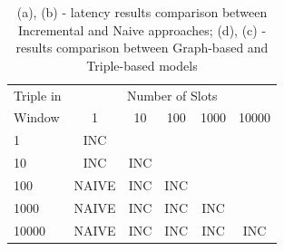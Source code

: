 \begin{table}[htbp]
{\begin{tabular}{l | ccccc}
	  	\hline
		Triple in & \multicolumn{5}{c}{Number of Slots}  \\
		 Window  & 1 & 10 & 100 & 1000&10000 \\
		\hline
		1    & INC\\
		10   & INC   & INC \\
		100  & NAIVE & INC & INC\\
		1000 & NAIVE & INC & INC & INC\\
		10000 & NAIVE & INC & INC & INC& INC\\
		\hline %
		\end{tabular}
	}	
	\caption{(a), (b) - latency results comparison between Incremental and Naive approaches; (d), (c) - results comparison between Graph-based and Triple-based models}
	\label{tab:soak_latency_comparisons}	
\end{table}
\pagebreak


